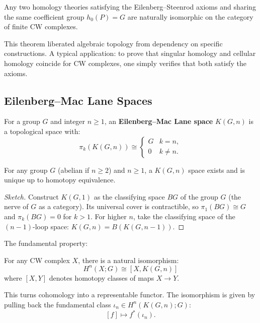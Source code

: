 \begin{theorem}
Any two homology theories satisfying the Eilenberg--Steenrod axioms and sharing the same coefficient group $h_0(P) = G$ are naturally isomorphic on the category of finite CW complexes.
\end{theorem}

This theorem liberated algebraic topology from dependency on specific constructions. A typical application: to prove that singular homology and cellular homology coincide for CW complexes, one simply verifies that both satisfy the axioms.

\subsection{Eilenberg--Mac Lane Spaces}

\begin{definition}[$K(G,n)$ Space]
For a group $G$ and integer $n \geq 1$, an \textbf{Eilenberg--Mac Lane space} $K(G,n)$ is a topological space with:
\[
\pi_k(K(G,n)) \cong 
\begin{cases}
G & k = n, \\
0 & k \neq n.
\end{cases}
\]
\end{definition}

\begin{theorem}
For any group $G$ (abelian if $n \geq 2$) and $n \geq 1$, a $K(G,n)$ space exists and is unique up to homotopy equivalence.
\end{theorem}

\begin{proof}[Sketch]
Construct $K(G,1)$ as the classifying space $BG$ of the group $G$ (the nerve of $G$ as a category). Its universal cover is contractible, so $\pi_1(BG) \cong G$ and $\pi_k(BG) = 0$ for $k > 1$. For higher $n$, take the classifying space of the $(n-1)$-loop space: $K(G,n) = B(K(G,n-1))$.
\end{proof}

The fundamental property:

\begin{theorem}
For any CW complex $X$, there is a natural isomorphism:
\[
H^n(X; G) \cong [X, K(G,n)]
\]
where $[X,Y]$ denotes homotopy classes of maps $X \to Y$.
\end{theorem}

This turns cohomology into a representable functor. The isomorphism is given by pulling back the fundamental class $\iota_n \in H^n(K(G,n); G)$:
\[
[f] \mapsto f^*(\iota_n).
\]

